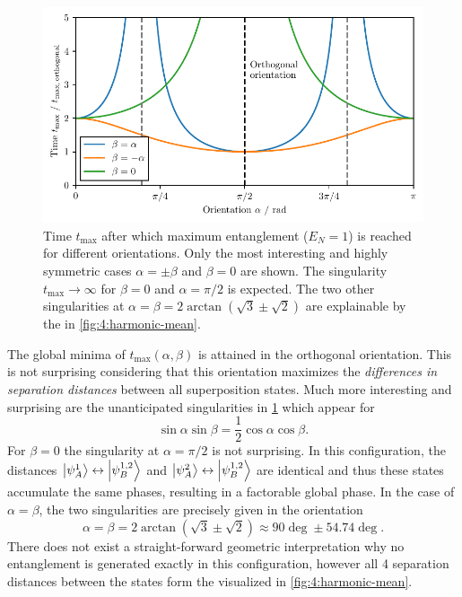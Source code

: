 \begin{figure}[!htbp]
  \centering
  \includegraphics[width=\textwidth]{./../figures/ideal-entanglement/t-max-orientation.pdf}
  \caption{Time $t_\mathrm{max}$ after which maximum entanglement ($E_N = 1$) is reached for different orientations. Only the most interesting and highly symmetric cases $\alpha=\pm\beta$ and $\beta=0$ are shown. The singularity $t_\mathrm{max} \rightarrow \infty$ for $\beta = 0$ and $\alpha = \pi/2$ is expected. The two other singularities at $\alpha = \beta = 2 \arctan(\sqrt{3} \pm \sqrt{2})$ are explainable by the  in \cref{fig:4:harmonic-mean}.}
  \label{fig:4:t-max-orientation}
\end{figure}
The global minima of $t_\mathrm{max}(\alpha,\beta)$ is attained in the orthogonal orientation. This is not surprising considering that this orientation maximizes the \textit{differences in separation distances} between all superposition states.
Much more interesting and surprising are the unanticipated singularities in \cref{fig:4:t-max-orientation} which appear for 
\begin{equation}
  \sin\alpha\sin\beta=\frac{1}{2}\cos\alpha\cos\beta .
\end{equation}
For $\beta=0$ the singularity at $\alpha=\pi/2$ is not surprising. In this configuration, the distances $\ket{\psi^1_A}\leftrightarrow\ket{\psi^{1,2}_B}$ and $\ket{\psi^2_A}\leftrightarrow\ket{\psi^{1,2}_B}$ are identical and thus these states accumulate the same phases, resulting in a factorable global phase.
In the case of $\alpha=\beta$, the two singularities are precisely given in the orientation
\begin{equation}
  \alpha=\beta=2 \arctan(\sqrt{3}\pm\sqrt{2})\approx 90\deg \pm 54.74\deg .
\end{equation}
There does not exist a straight-forward geometric interpretation why no entanglement is generated exactly in this configuration, however all 4 separation distances between the states form the  visualized in \cref{fig:4:harmonic-mean}.
